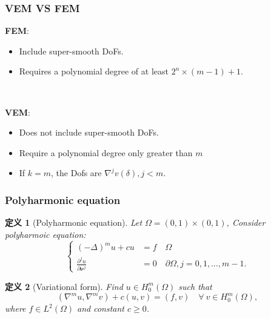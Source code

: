 \documentclass[notheorems,serif]{beamer}
\newcommand{\hei}[1]{{\HEI#1}}
\newtheorem{definition}{\hei{定义}}
\begin{document}
\begin{frame}
    \frametitle{VEM VS FEM}
\begin{minipage}[b]{0.49\linewidth}
    \large{\textbf{FEM}}:
    \begin{itemize}
        \item Include super-smooth DoFs.
        \item Requires a polynomial degree of at least $2^n \times (m-1)
            +1$.
    \end{itemize}
    \hfill \\
\end{minipage}
\hfill
\begin{minipage}[b]{0.49\linewidth}
    \large{\textbf{VEM}}:
    \begin{itemize}
        \item Does not include super-smooth DoFs.
        \item Require a polynomial degree only greater than $m$
        \item If $k = m$, the Dofs are $\nabla^j v(\delta), j < m$.
    \end{itemize}
\end{minipage}
\end{frame}

\begin{frame}
\frametitle{Polyharmonic equation}

\begin{definition}[Polyharmonic equation]
  Let $\Omega = (0, 1)\times(0, 1)$, Consider polyharmoic equation:
  $$
  \left\{
  \begin{aligned}
      (-\Delta)^m u + c u & = f \quad \Omega\\
      \frac{\partial^j u}{\partial \boldsymbol{\nu}^j} & = 0 \quad \partial\Omega,
      j = 0, 1, \dots, m-1.
  \end{aligned}
  \right.
  $$
\end{definition}
\begin{definition}[Variational form]
Find $u\in H_0^m(\Omega)$ such that
$$
(\nabla^mu, \nabla^mv)+c(u, v)=(f, v)\quad\forall~v\in H_0^m(\Omega),
$$
where $f\in L^2(\Omega)$ and constant $c\geq0$.
\end{definition}
\hspace*{\fill} \\
\hspace*{\fill} \\
\hspace*{\fill} \\
\hspace*{\fill} \\
\hspace*{\fill} \\
\end{frame}
\end{document}
